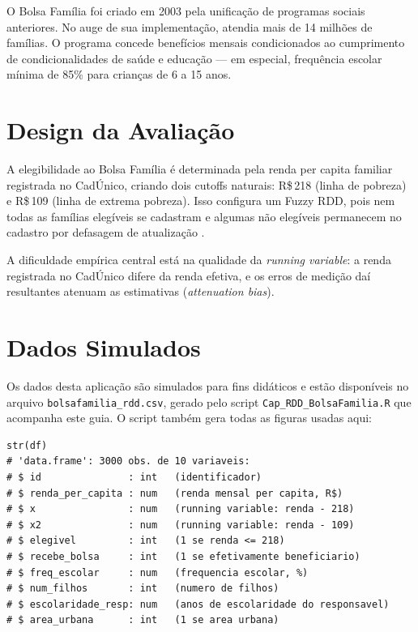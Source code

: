 \documentclass[12pt, a4paper, openany]{book}
\begin{document}
O Bolsa Fam\'ilia foi criado em 2003 pela unifica\c{c}\~ao de programas sociais anteriores. No auge de sua implementa\c{c}\~ao, atendia mais de 14 milh\~oes de fam\'ilias. O programa concede benef\'icios mensais condicionados ao cumprimento de condicionalidades de sa\'ude e educa\c{c}\~ao --- em especial, frequ\^encia escolar m\'inima de 85\% para crian\c{c}as de 6 a 15 anos.

\section{Design da Avalia\c{c}\~ao}

A elegibilidade ao Bolsa Fam\'ilia \'e determinada pela renda per capita familiar registrada no Cad\'Unico, criando dois cutoffs naturais: R\$\,218 (linha de pobreza) e R\$\,109 (linha de extrema pobreza). Isso configura um Fuzzy RDD, pois nem todas as fam\'ilias eleg\'iveis se cadastram e algumas n\~ao eleg\'iveis permanecem no cadastro por defasagem de atualiza\c{c}\~ao \citep{Romero2009}.

A dificuldade emp\'irica central est\'a na qualidade da \textit{running variable}: a renda registrada no Cad\'Unico difere da renda efetiva, e os erros de medi\c{c}\~ao da\'i resultantes atenuam as estimativas (\textit{attenuation bias}).

\section{Dados Simulados}

Os dados desta aplica\c{c}\~ao s\~ao simulados para fins did\'aticos e est\~ao dispon\'iveis no arquivo \texttt{bolsafamilia\_rdd.csv}, gerado pelo script \texttt{Cap\_RDD\_BolsaFamilia.R} que acompanha este guia. O script tamb\'em gera todas as figuras usadas aqui:

\begin{lstlisting}[style=Rstyle]
str(df)
# 'data.frame': 3000 obs. de 10 variaveis:
# $ id               : int   (identificador)
# $ renda_per_capita : num   (renda mensal per capita, R$)
# $ x                : num   (running variable: renda - 218)
# $ x2               : num   (running variable: renda - 109)
# $ elegivel         : int   (1 se renda <= 218)
# $ recebe_bolsa     : int   (1 se efetivamente beneficiario)
# $ freq_escolar     : num   (frequencia escolar, %)
# $ num_filhos       : int   (numero de filhos)
# $ escolaridade_resp: num   (anos de escolaridade do responsavel)
# $ area_urbana      : int   (1 se area urbana)
\end{lstlisting}
\end{document}
